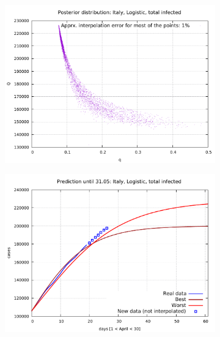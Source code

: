 \documentclass[8pt]{article}
\begin{document}
\begin{figure}[h!]
  \centering
  \begin{subfigure}[b]{0.5\linewidth}
  \includegraphics[width=\linewidth]{../it_l_t/posterior.pdf}
  \end{subfigure}  \begin{subfigure}[b]{0.48\linewidth}
    \includegraphics[width=\linewidth]{../it_l_t/prediction.pdf}
  \end{subfigure}
  \begin{subfigure}[b]{0.48\linewidth}

\end{subfigure}
\end{figure}
\end{document}
